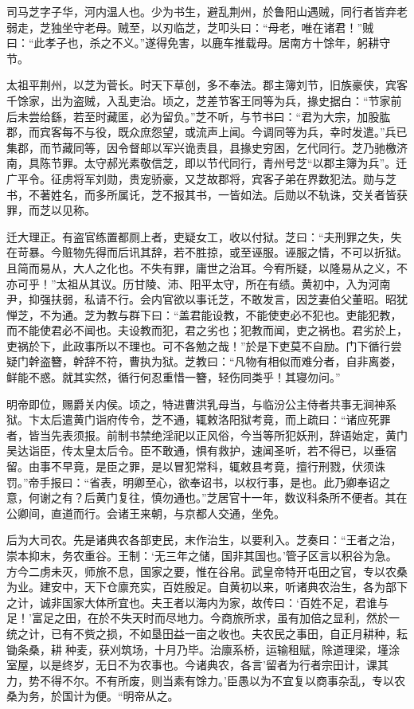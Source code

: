 \documentclass[12pt,UTF8]{ctexbook}
\begin{document}
司马芝字子华，河内温人也。少为书生，避乱荆州，於鲁阳山遇贼，同行者皆弃老弱走，芝独坐守老母。贼至，以刃临芝，芝叩头曰：“母老，唯在诸君！”贼曰：“此孝子也，杀之不义。”遂得免害，以鹿车推载母。居南方十馀年，躬耕守节。

太祖平荆州，以芝为菅长。时天下草创，多不奉法。郡主簿刘节，旧族豪侠，宾客千馀家，出为盗贼，入乱吏治。顷之，芝差节客王同等为兵，掾史据白：“节家前后未尝给繇，若至时藏匿，必为留负。”芝不听，与节书曰：“君为大宗，加股肱郡，而宾客每不与役，既众庶怨望，或流声上闻。今调同等为兵，幸时发遣。”兵已集郡，而节藏同等，因令督邮以军兴诡责县，县掾史穷困，乞代同行。芝乃驰檄济南，具陈节罪。太守郝光素敬信芝，即以节代同行，青州号芝“以郡主簿为兵”。迁广平令。征虏将军刘勋，贵宠骄豪，又芝故郡将，宾客子弟在界数犯法。勋与芝书，不著姓名，而多所属讬，芝不报其书，一皆如法。后勋以不轨诛，交关者皆获罪，而芝以见称。

迁大理正。有盗官练置都厕上者，吏疑女工，收以付狱。芝曰：“夫刑罪之失，失在苛暴。今赃物先得而后讯其辞，若不胜掠，或至诬服。诬服之情，不可以折狱。且简而易从，大人之化也。不失有罪，庸世之治耳。今宥所疑，以隆易从之义，不亦可乎！”太祖从其议。历甘陵、沛、阳平太守，所在有绩。黄初中，入为河南尹，抑强扶弱，私请不行。会内官欲以事讬芝，不敢发言，因芝妻伯父董昭。昭犹惮芝，不为通。芝为教与群下曰：“盖君能设教，不能使吏必不犯也。吏能犯教，而不能使君必不闻也。夫设教而犯，君之劣也；犯教而闻，吏之祸也。君劣於上，吏祸於下，此政事所以不理也。可不各勉之哉！”於是下吏莫不自励。门下循行尝疑门幹盗簪，幹辞不符，曹执为狱。芝教曰：“凡物有相似而难分者，自非离娄，鲜能不惑。就其实然，循行何忍重惜一簪，轻伤同类乎！其寝勿问。”

明帝即位，赐爵关内侯。顷之，特进曹洪乳母当，与临汾公主侍者共事无涧神系狱。卞太后遣黄门诣府传令，芝不通，辄敕洛阳狱考竟，而上疏曰：“诸应死罪者，皆当先表须报。前制书禁绝淫祀以正风俗，今当等所犯妖刑，辞语始定，黄门吴达诣臣，传太皇太后令。臣不敢通，惧有救护，速闻圣听，若不得已，以垂宿留。由事不早竟，是臣之罪，是以冒犯常科，辄敕县考竟，擅行刑戮，伏须诛罚。”帝手报曰：“省表，明卿至心，欲奉诏书，以权行事，是也。此乃卿奉诏之意，何谢之有？后黄门复往，慎勿通也。”芝居官十一年，数议科条所不便者。其在公卿间，直道而行。会诸王来朝，与京都人交通，坐免。

后为大司农。先是诸典农各部吏民，末作治生，以要利入。芝奏曰：“王者之治，崇本抑末，务农重谷。王制：‘无三年之储，国非其国也。’管子区言以积谷为急。方今二虏未灭，师旅不息，国家之要，惟在谷帛。武皇帝特开屯田之官，专以农桑为业。建安中，天下仓廪充实，百姓殷足。自黄初以来，听诸典农治生，各为部下之计，诚非国家大体所宜也。夫王者以海内为家，故传曰：‘百姓不足，君谁与足！'富足之田，在於不失天时而尽地力。今商旅所求，虽有加倍之显利，然於一统之计，已有不赀之损，不如垦田益一亩之收也。夫农民之事田，自正月耕种，耘锄条桑，耕种麦，获刈筑场，十月乃毕。治廪系桥，运输租赋，除道理梁，墐涂室屋，以是终岁，无日不为农事也。今诸典农，各言'留者为行者宗田计，课其力，势不得不尔。不有所废，则当素有馀力。’臣愚以为不宜复以商事杂乱，专以农桑为务，於国计为便。“明帝从之。
\end{document}
